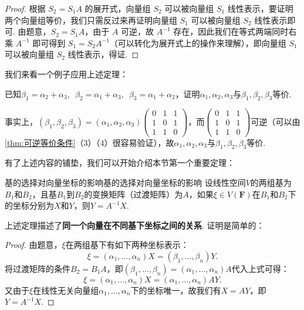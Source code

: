 \begin{proof}
    根据 $S_2 = S_1A$ 的展开式，向量组 $S_2$ 可以被向量组 $S_1$ 线性表示，要证明两个向量组等价，我们只需反过来再证明向量组 $S_1$ 可以被向量组 $S_2$ 线性表示即可. 由题意，$S_2 = S_1A$，由于 $A$ 可逆，故 $A^{-1}$ 存在，因此我们在等式两端同时右乘 $A^{-1}$ 即可得到 $S_1 = S_2A^{-1}$（可以转化为展开式上的操作来理解），即向量组 $S_1$ 可以被向量组 $S_2$ 线性表示，得证.
\end{proof}

我们来看一个例子应用上述定理：
\begin{example}{}{}
    已知$\beta_1=\alpha_2+\alpha_3,\enspace\beta_2=\alpha_1+\alpha_3,\enspace\beta_3=\alpha_1+\alpha_2$，证明$\alpha_1,\alpha_2,\alpha_3$与$\beta_1,\beta_2,\beta_3$等价.
\end{example}

\begin{solution}
    事实上，$(\beta_1,\beta_2,\beta_3)=(\alpha_1,\alpha_2,\alpha_3)\begin{pmatrix}
            0 & 1 & 1 \\
            1 & 0 & 1 \\
            1 & 1 & 0
        \end{pmatrix}$，而$\begin{pmatrix}
            0 & 1 & 1 \\
            1 & 0 & 1 \\
            1 & 1 & 0
        \end{pmatrix}$可逆（可以由\autoref{thm:可逆等价条件}（3）（4）很容易验证），故$\alpha_1,\alpha_2,\alpha_3$与$\beta_1,\beta_2,\beta_3$等价.
\end{solution}

有了上述内容的铺垫，我们可以开始介绍本节第一个重要定理：
\begin{theorem}{基的选择对向量坐标的影响}{基的选择对向量坐标的影响}
    设线性空间$V$的两组基为$B_1$和$B_2$，且基$B_1$到$B_2$的变换矩阵（过渡矩阵）为$A$，如果$\xi \in V(\mathbf{F})$在$B_1$和$B_2$下的坐标分别为$X$和$Y$，则$Y=A^{-1}X$.
\end{theorem}
上述定理描述了\textbf{同一个向量在不同基下坐标之间的关系}. 证明是简单的：

\begin{proof}
    由题意，$\xi$在两组基下有如下两种坐标表示：
    \[\xi=(\alpha_1,\ldots,\alpha_n)X=(\beta_1,\ldots,\beta_n)Y.\]
    将过渡矩阵的条件$B_2=B_1A$，即$(\beta_1,\ldots,\beta_n)=(\alpha_1,\ldots,\alpha_n)A$代入上式可得：
    \[\xi=(\alpha_1,\ldots,\alpha_n)X=(\alpha_1,\ldots,\alpha_n)AY.\]
    又由于$\xi$在线性无关向量组$\alpha_1,\ldots,\alpha_n$下的坐标唯一，故我们有$X=AY$，即$Y=A^{-1}X$.
\end{proof}

